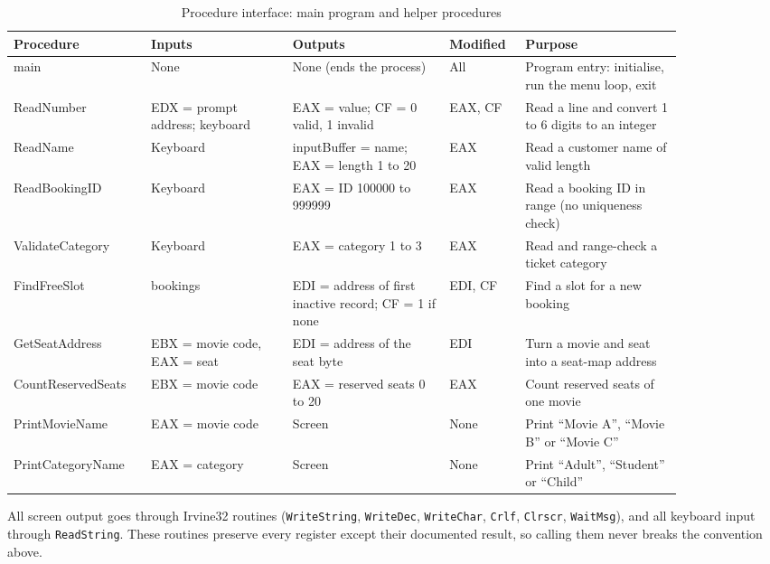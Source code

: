 \documentclass{thesis-library}
\newcommand{\tablefont}{\footnotesize\setstretch{1.15}\hyphenpenalty=10000\relax}
\begin{document}
\begin{table}[H]
\centering
\tablefont
\caption{Procedure interface: main program and helper procedures}
\label{tab:iface-help}
\begin{tabular}{|L{0.16\linewidth}|L{0.19\linewidth}|L{0.21\linewidth}|L{0.09\linewidth}|L{0.21\linewidth}|}
\hline
\textbf{Procedure} & \textbf{Inputs} & \textbf{Outputs} & \textbf{Modified} & \textbf{Purpose} \\
\hline
main & None & None (ends the process) & All & Program entry: initialise, run the menu loop, exit \\
\hline
ReadNumber & EDX = prompt address; keyboard & EAX = value; CF = 0 valid, 1 invalid & EAX, CF & Read a line and convert 1 to 6 digits to an integer \\
\hline
ReadName & Keyboard & inputBuffer = name; EAX = length 1 to 20 & EAX & Read a customer name of valid length \\
\hline
ReadBookingID & Keyboard & EAX = ID 100000 to 999999 & EAX & Read a booking ID in range (no uniqueness check) \\
\hline
ValidateCategory & Keyboard & EAX = category 1 to 3 & EAX & Read and range-check a ticket category \\
\hline
FindFreeSlot & bookings & EDI = address of first inactive record; CF = 1 if none & EDI, CF & Find a slot for a new booking \\
\hline
GetSeatAddress & EBX = movie code, EAX = seat & EDI = address of the seat byte & EDI & Turn a movie and seat into a seat-map address \\
\hline
CountReservedSeats & EBX = movie code & EAX = reserved seats 0 to 20 & EAX & Count reserved seats of one movie \\
\hline
PrintMovieName & EAX = movie code & Screen & None & Print ``Movie A'', ``Movie B'' or ``Movie C'' \\
\hline
PrintCategoryName & EAX = category & Screen & None & Print ``Adult'', ``Student'' or ``Child'' \\
\hline
\end{tabular}
\end{table}

All screen output goes through Irvine32 routines (\texttt{WriteString}, \texttt{WriteDec}, \texttt{WriteChar}, \texttt{Crlf}, \texttt{Clrscr}, \texttt{WaitMsg}), and all keyboard input through \texttt{ReadString}. These routines preserve every register except their documented result, so calling them never breaks the convention above.
\end{document}
